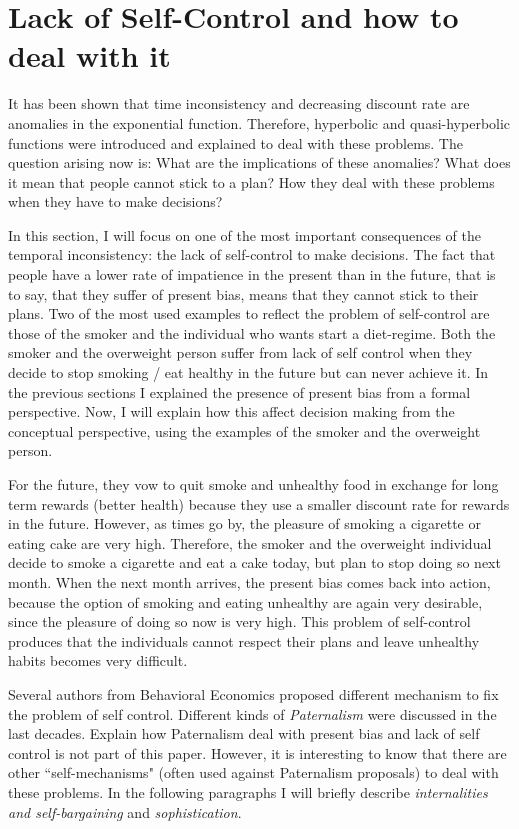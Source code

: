 \documentclass[]{article}
\begin{document}
\hypertarget{lack-of-self-control-and-how-to-deal-with-it}{%
\section{Lack of Self-Control and how to deal with it}\label{lack-of-self-control-and-how-to-deal-with-it}}

It has been shown that time inconsistency and decreasing discount rate are anomalies in the exponential function. Therefore, hyperbolic and quasi-hyperbolic functions were introduced and explained to deal with these problems. The question arising now is: What are the implications of these anomalies? What does it mean that people cannot stick to a plan? How they deal with these problems when they have to make decisions?

In this section, I will focus on one of the most important consequences of the temporal inconsistency: the lack of self-control to make decisions. The fact that people have a lower rate of impatience in the present than in the future, that is to say, that they suffer of present bias, means that they cannot stick to their plans.
Two of the most used examples to reflect the problem of self-control are those of the smoker and the individual who wants start a diet-regime. Both the smoker and the overweight person suffer from lack of self control when they decide to stop smoking / eat healthy in the future but can never achieve it. In the previous sections I explained the presence of present bias from a formal perspective. Now, I will explain how this affect decision making from the conceptual perspective, using the examples of the smoker and the overweight person.

For the future, they vow to quit smoke and unhealthy food in exchange for long term rewards (better health) because they use a smaller discount rate for rewards in the future. However, as times go by, the pleasure of smoking a cigarette or eating cake are very high. Therefore, the smoker and the overweight individual decide to smoke a cigarette and eat a cake today, but plan to stop doing so next month. When the next month arrives, the present bias comes back into action, because the option of smoking and eating unhealthy are again very desirable, since the pleasure of doing so now is very high. This problem of self-control produces that the individuals cannot respect their plans and leave unhealthy habits becomes very difficult.

Several authors from Behavioral Economics proposed different mechanism to fix the problem of self control. Different kinds of \emph{Paternalism} were discussed in the last decades. Explain how Paternalism deal with present bias and lack of self control is not part of this paper. However, it is interesting to know that there are other ``self-mechanisms" (often used against Paternalism proposals) to deal with these problems. In the following paragraphs I will briefly describe \emph{internalities and self-bargaining} and \emph{sophistication}.
\end{document}
